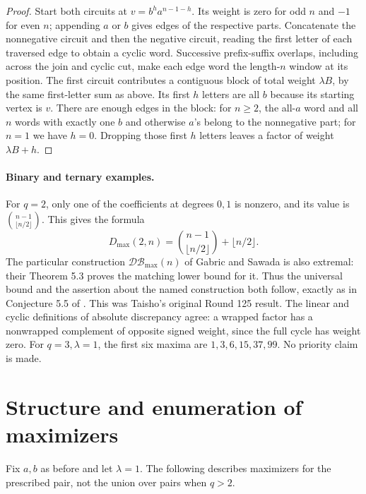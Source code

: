 \documentclass[11pt]{article}
\begin{document}
\begin{proof}
Start both circuits at \(v=b^h a^{n-1-h}\). Its weight is zero
for odd \(n\) and \(-1\) for even \(n\); appending \(a\) or \(b\)
gives edges of the respective parts. Concatenate the nonnegative
circuit and then the negative circuit, reading the first letter
of each traversed edge to obtain a cyclic word. Successive
prefix-suffix overlaps, including across the join and cyclic cut,
make each edge word the length-\(n\) window at its position.
The first circuit contributes a contiguous block of total
weight \(\lambda B\), by the same first-letter sum as above.
Its first \(h\) letters are all \(b\) because its starting
vertex is \(v\). There are enough edges in the block: for \(n\ge2\),
the all-\(a\) word and all \(n\) words with exactly one \(b\) and
otherwise \(a\)'s belong to the nonnegative part; for \(n=1\)
we have \(h=0\). Dropping those first \(h\) letters leaves a
factor of weight \(\lambda B+h\).
\end{proof}

\paragraph{Binary and ternary examples.}

For \(q=2\), only one of the coefficients at degrees \(0,1\)
is nonzero, and its value is \(\binom{n-1}{\lfloor n/2\rfloor}\).
This gives the formula
\[
 D_{\max}(2,n)=\binom{n-1}{\lfloor n/2\rfloor}+\lfloor n/2\rfloor.
\]
The particular construction \(\mathcal{DB}_{\max}(n)\) of Gabric
and Sawada is also extremal: their Theorem 5.3 proves the matching
lower bound for it. Thus the universal bound and the assertion
about the named construction both follow, exactly as in
Conjecture 5.5 of \cite{GabricSawada}. This was Taisho's original Round 125
result. The linear and cyclic definitions of absolute discrepancy
agree: a wrapped factor has a nonwrapped complement of opposite
signed weight, since the full cycle has weight zero.
For \(q=3,\lambda=1\), the first six maxima are \(1,3,6,15,37,99\).
No priority claim is made.

\section{Structure and enumeration of maximizers}

Fix \(a,b\) as before and let \(\lambda=1\). The following
describes maximizers for the prescribed pair, not the union
over pairs when \(q>2\).
\end{document}
